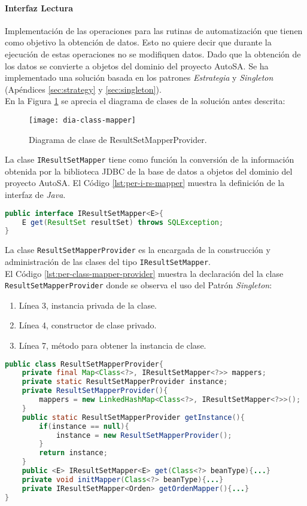 \paragraph{\indent Interfaz Lectura\\}
Implementación de las operaciones para las rutinas de automatización que tienen como objetivo la obtención de datos. Esto no quiere decir que durante la ejecución de estas operaciones no se modifiquen datos.
Dado que la obtención de los datos se convierte a objetos del dominio del proyecto AutoSA. Se ha implementado una solución basada en los patrones \textit{Estrategia} y \textit{Singleton} (Apéndices \ref{sec:strategy} y \ref{sec:singleton}). \\
En la Figura \ref{fig:dia-class-mapper} se aprecia el diagrama de clases de la solución antes descrita:
\begin{figure}[h]
	\centering
	\texttt{[image: dia-class-mapper]}
	\caption{Diagrama de clase de ResultSetMapperProvider.}
	\label{fig:dia-class-mapper}
\end{figure}
\newline La clase \texttt{IResultSetMapper} tiene como función la conversión de la información obtenida por la biblioteca JDBC de la base de datos a objetos del dominio del proyecto AutoSA. El Código \ref{lst:per-i-rs-mapper} muestra la definición de la interfaz de \textit{Java}.
	\begin{lstlisting}[language=Java, caption={Interfaz IResultSetMapper.}, captionpos=b, label={lst:per-i-rs-mapper}]
public interface IResultSetMapper<E>{
	E get(ResultSet resultSet) throws SQLException;
}
	\end{lstlisting}
La clase \texttt{ResultSetMapperProvider} es la encargada de la construcción y administración de las clases del tipo \texttt{IResultSetMapper}.\\
El Código \ref{lst:per-class-mapper-provider} muestra la declaración del la clase \texttt{ResultSetMapperProvider} donde se observa el uso del Patrón \textit{Singleton}:
\begin{enumerate}
	\item Línea 3, instancia privada de la clase.
	\item Línea 4, constructor de clase privado.
	\item Línea 7, método para obtener la instancia de clase.
\end{enumerate}
\begin{lstlisting}[language=Java, caption={Clase ResultSetMapperProvider con Patrón \textit{Singleton}.}, captionpos=b, label={lst:per-class-mapper-provider}]
public class ResultSetMapperProvider{
	private final Map<Class<?>, IResultSetMapper<?>> mappers;
	private static ResultSetMapperProvider instance;
	private ResultSetMapperProvider(){
		mappers = new LinkedHashMap<Class<?>, IResultSetMapper<?>>();
	}
	public static ResultSetMapperProvider getInstance(){
		if(instance == null){
			instance = new ResultSetMapperProvider();
		}
		return instance;
	}
	public <E> IResultSetMapper<E> get(Class<?> beanType){...}
	private void initMapper(Class<?> beanType){...}
	private IResultSetMapper<Orden> getOrdenMapper(){...}
}
\end{lstlisting}
